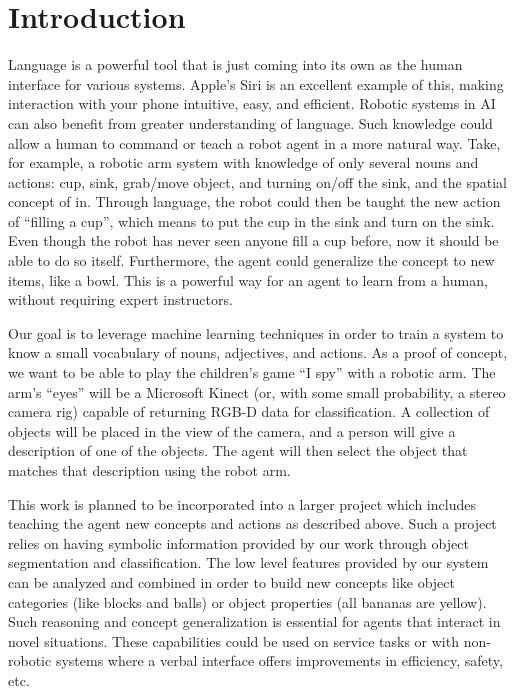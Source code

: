 \documentclass[11pt]{article}
\newcommand{\xxx}[1]{{\bf \color{red} #1}}
\begin{document}
\section{Introduction}
Language is a powerful tool that is just coming into its own as the human
interface for various systems. Apple's Siri is an excellent example of this, making interaction with your phone intuitive, easy, and efficient. Robotic systems in AI can also benefit from greater understanding of
language. Such knowledge could allow a human to command or teach a robot agent in a more natural way. Take, for example, a robotic arm system with knowledge of only
several nouns and actions: cup, sink, grab/move object, and turning on/off
the sink, and the spatial concept of in. Through language, the robot could then be taught the new action of ``filling a cup'', which means to put the cup in the sink and turn on the
sink. Even though the robot has never seen anyone fill a cup before, now
it should be able to do so itself. Furthermore, the agent could generalize the concept to new items, like a bowl. This is a powerful
way for an agent to learn from a human, without requiring expert instructors.

Our goal is to leverage machine learning techniques in order to train a system to know a small vocabulary of nouns, adjectives,
and actions. As a proof of concept, we want to be able to play the children's
game ``I spy'' with a robotic arm. The arm's ``eyes'' will be a Microsoft
Kinect (or, with some small probability, a stereo camera rig) capable of
returning RGB-D data for classification. A collection of objects will be placed in the view of the camera, and a person will give a description of one of the objects. The agent will then select the object that matches that description using the robot arm.

This work is planned to be incorporated into a larger project which includes teaching the agent new concepts and actions as described above. Such a project relies on having symbolic information provided by our work through object segmentation and classification. The low level features provided by our system can be analyzed and combined in order to build new concepts like object categories (like blocks and balls) or object properties (all bananas are yellow). Such reasoning and concept generalization is essential for agents that interact in novel situations. These capabilities could be used on service tasks or with non-robotic systems where a verbal interface
offers improvements in efficiency, safety, etc.
\end{document}
